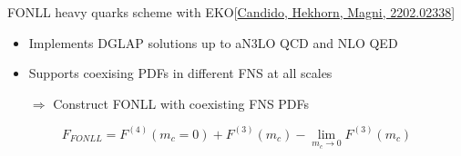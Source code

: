 \documentclass[aspectratio=43, 8pt,t]{beamer}
\begin{document}
\begin{frame}{FONLL heavy quarks scheme with EKO}{\color{gray}\footnotesize [\hyperlink{https://arxiv.org/abs/2202.02338}{Candido, Hekhorn, Magni, 2202.02338}]}
\begin{figure}
  \end{figure}
  \begin{itemize}
    \item Implements DGLAP solutions up to aN3LO QCD and NLO QED
    \item Supports coexising PDFs in different FNS at all scales
    \item[$\Rightarrow$] Construct FONLL with coexisting FNS PDFs
  \end{itemize}

  $$F_{FONLL} = F^{(4)}(m_c=0) + F^{(3)}(m_c) - \lim_{m_c\rightarrow 0} F^{(3)}(m_c)$$
\end{frame}
\end{document}
